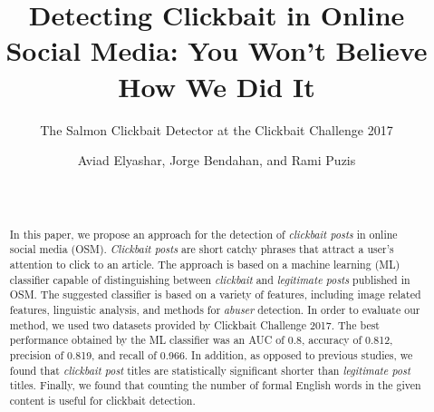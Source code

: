 \documentclass{sig-alternate}
\begin{document}
\title{Detecting Clickbait in Online Social Media: You Won't Believe How We Did It}
\subtitle{The Salmon Clickbait Detector at the Clickbait Challenge 2017}

\author{
\alignauthor
Aviad Elyashar, Jorge Bendahan, and Rami Puzis\\
\\
\\
\alignauthor
}

\maketitle

\begin{abstract}
In this paper, we propose an approach for the detection of \emph{clickbait posts} in online social media (OSM). 
\emph{Clickbait posts} are short catchy phrases that attract a user's attention to click to an article.  
The approach is based on a machine learning (ML) classifier capable of distinguishing between \emph{clickbait} and \emph{legitimate posts} published in OSM.
The suggested classifier is based on a variety of features, including image related features, linguistic analysis, and methods for \emph{abuser} detection. 
In order to evaluate our method, we used two datasets provided by Clickbait Challenge 2017.
The best performance obtained by the ML classifier was an AUC of 0.8, accuracy of 0.812, precision of 0.819, and recall of 0.966.
In addition, as opposed to previous studies, we found that \emph{clickbait post} titles are statistically significant shorter than \emph{legitimate post} titles. 
Finally, we found that counting the number of formal English words in the given content%
is useful for clickbait detection. 

\end{abstract}


\end{document}
